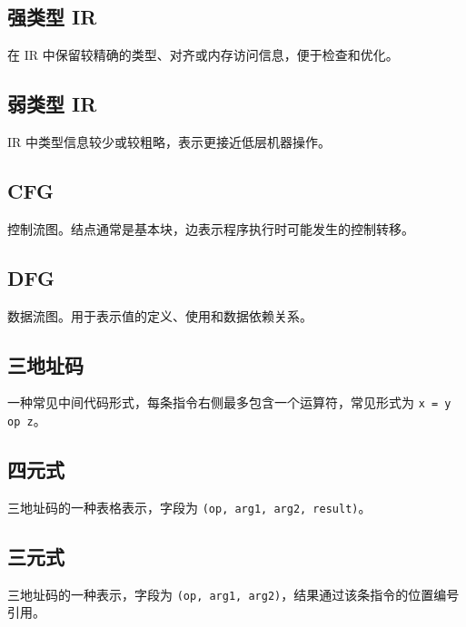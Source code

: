 \documentclass[UTF8,zihao=-4]{ctexart}
\begin{document}
\subsection*{强类型 IR}

在 IR 中保留较精确的类型、对齐或内存访问信息，便于检查和优化。

\subsection*{弱类型 IR}

IR 中类型信息较少或较粗略，表示更接近低层机器操作。

\subsection*{CFG}

控制流图。结点通常是基本块，边表示程序执行时可能发生的控制转移。

\subsection*{DFG}

数据流图。用于表示值的定义、使用和数据依赖关系。

\subsection*{三地址码}

一种常见中间代码形式，每条指令右侧最多包含一个运算符，常见形式为 \texttt{x = y op z}。

\subsection*{四元式}

三地址码的一种表格表示，字段为 \texttt{(op, arg1, arg2, result)}。

\subsection*{三元式}

三地址码的一种表示，字段为 \texttt{(op, arg1, arg2)}，结果通过该条指令的位置编号引用。
\end{document}

